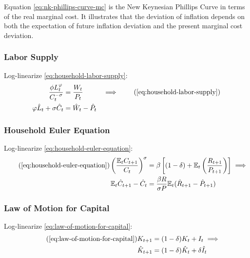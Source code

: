 \documentclass[
thesis.tex
]{subfiles}
\begin{document}
	Equation \ref{eq:nk-phillips-curve-mc} is the New Keynesian Phillips Curve in terms of the real marginal cost. It illustrates that the deviation of inflation depends on both the expectation of future inflation deviation and the present marginal cost deviation.
	
	
	\subsubsection*{Labor Supply}
	
	Log-linearize \ref{eq:household-labor-supply}:
	\begin{alignat}{2}
		\frac{\phi L_t^{\varphi}}{C_t^{-\sigma}} &= \frac{W_t}{P_t} & \implies \tag{\ref{eq:household-labor-supply}} \\
		\varphi \hat{L}_t + \sigma \hat{C}_t &= \hat{W}_t - \hat{P}_t & \label{eq:ll-labor-supply}
	\end{alignat}
	
	
	\subsubsection*{Household Euler Equation}
	
	Log-linearize \ref{eq:household-euler-equation}:
	\begin{align}
		\tag{\ref{eq:household-euler-equation}}
		\left( \frac{\mathbb{E}_t C_{t+1}}{C_t} \right)^\sigma &= \beta \left[ (1-\delta) + \mathbb{E}_t \left(\frac{R_{t+1}}{P_{t+1}}\right) \right] \implies \\
		\label{eq:ll-household-euler-equation}
		\E \hat{C}_{t+1} - \hat{C}_t &= \frac{\beta R}{\sigma P} \E(\hat{R}_{t+1} - \hat{P}_{t+1})
	\end{align}
	
	
	\subsubsection*{Law of Motion for Capital}
	
	Log-linearize \ref{eq:law-of-motion-for-capital}:
	\begin{align}
		\tag{\ref{eq:law-of-motion-for-capital}}
		K_{t+1} &= (1-\delta)K_t + I_t \implies \\
		\label{eq:ll-law-of-motion-for-capital}
		\hat{K}_{t+1} &= (1-\delta)\hat{K}_t + \delta \hat{I}_t
	\end{align}
	
\end{document}
